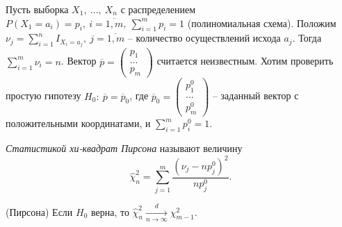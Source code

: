 Пусть выборка $\displaystyle X_{1} ,\ \dotsc ,\ X_{n}$ с распределением $\displaystyle P( X_{1} =a_{i}) =p_{i} ,\ i=\overline{1,m} ,\ \sum _{i=1}^{m} p_{i} =1$ (полиномиальная схема). Положим $\displaystyle \nu _{j} =\sum _{i=1}^{n} I_{X_{i} =a_{j}} ,\ j=\overline{1,m}$ -- количество осуществлений исхода $\displaystyle a_{j}$. Тогда $\displaystyle \sum _{i=1}^{m} \nu _{i} =n$. Вектор $\displaystyle \overline{p} =\begin{pmatrix}
p_{1}\\
\dotsc \\
p_{m}
\end{pmatrix}$ считается неизвестным. Хотим проверить простую гипотезу $\displaystyle H_{0} :\ \overline{p} =\overline{p}_{0}$, где $\displaystyle \overline{p}_{0} =\begin{pmatrix}
p_{1}^{0}\\
\dotsc \\
p_{m}^{0}
\end{pmatrix}$ -- заданный вектор с положительными координатами, и $\displaystyle \sum _{i=1}^{m} p_{i}^{0} =1$.
\begin{definition}
    \textit{Статистикой хи-квадрат Пирсона} называют величину
    \begin{equation*}
        \hat{\chi }_{n}^{2} =\sum _{j=1}^{m}\dfrac{\left( \nu _{j} -np_{j}^{0}\right)^{2}}{np_{j}^{0}} .
    \end{equation*}
\end{definition}
\begin{theorem}
    (Пирсона) Если $\displaystyle H_{0}$ верна, то $\displaystyle \hat{\chi }_{n}^{2}\xrightarrow[n\rightarrow \infty ]{d} \chi _{m-1}^{2}$.
\end{theorem}
